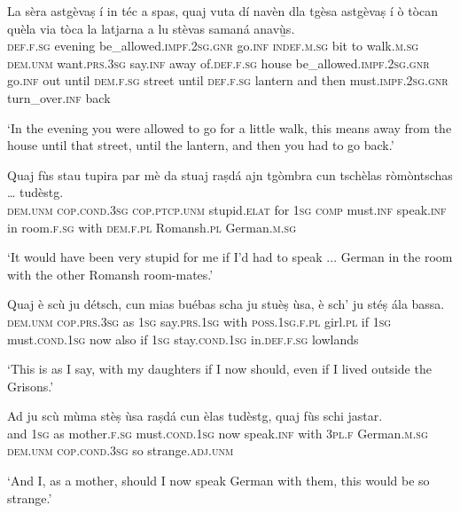 \begin{linenumbers}
\gll    La sèra astgèvaṣ í in téc a spas, quaj vuta dí navèn dla tgèsa astgèvaṣ í ò tòcan quèla via tòca la latjarna a lu stèvas samaná anavù̱s.\\
 \textsc{def.f.sg} evening be\_allowed.\textsc{impf.2sg.gnr} go.\textsc{inf} \textsc{indef.m.sg} bit to walk.\textsc{m.sg} \textsc{dem.unm} want.\textsc{prs.3sg} say.\textsc{inf} away of.\textsc{def.f.sg} house be\_allowed.\textsc{impf.2sg.gnr} go.\textsc{inf} out until \textsc{dem.f.sg} street until \textsc{def.f.sg} lantern and then must.\textsc{impf.2sg.gnr} turn\_over.\textsc{inf} back\\
\end{linenumbers}
\medskip
\glt `In the evening you were allowed to go for a little walk, this means away from the house until that street, until the lantern, and then you had to go back.'
\medskip

\begin{linenumbers}
\gll    Quaj fùs stau tupira par mè da stuaj raṣdá ajn tgòmbra cun tschèlas ròmòntschas … tudèstg.\\
 \textsc{dem.unm} \textsc{cop.cond.3sg} \textsc{cop.ptcp.unm} stupid.\textsc{elat}  for \textsc{1sg} \textsc{comp} must.\textsc{inf} speak.\textsc{inf} in room.\textsc{f.sg} with \textsc{dem.f.pl} Romansh.\textsc{pl} {} German.\textsc{m.sg}\\
\end{linenumbers}
\medskip
\glt `It would have been very stupid for me if I'd had to speak ... German in the room with the other Romansh room-mates.'
\medskip

\begin{linenumbers}
\gll    Quaj è scù ju détsch, cun mias buébas scha ju stuèṣ ùsa, è sch’ ju stéṣ ála bassa.\\
 \textsc{dem.unm} \textsc{cop.prs.3sg} as \textsc{1sg} say.\textsc{prs.1sg} with \textsc{poss.1sg.f.pl} girl.\textsc{pl} if \textsc{1sg} must.\textsc{cond.1sg} now also if \textsc{1sg} stay.\textsc{cond.1sg} in.\textsc{def.f.sg} lowlands\\
\end{linenumbers}
\medskip
\glt `This is as I say, with my daughters if I now should, even if I lived outside the Grisons.'
\medskip

\begin{linenumbers}
\gll    Ad ju scù mùma stèṣ ùsa raṣdá cun èlas tudèstg, quaj fùs schi jastar.\footnotemark \\
and \textsc{1sg} as mother.\textsc{f.sg} must.\textsc{cond.1sg} now speak.\textsc{inf} with \textsc{3pl.f} German.\textsc{m.sg} \textsc{dem.unm} \textsc{cop.cond.3sg} so strange.\textsc{adj.unm}\\
\end{linenumbers}
\medskip
\glt `And I, as a mother, should I now speak German with them, this would be so strange.'
\medskip

